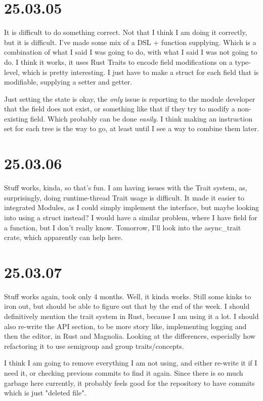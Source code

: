 \section{25.03.05}

It is difficult to do something correct. Not that I think I am doing it
correctly, but it is difficult. I've made some mix of a DSL + function
supplying. Which is a combination of what I said I was going to do, with what I
said I was not going to do. I think it works, it uses Rust Traits to encode
field modifications on a type-level, which is pretty interesting. I just have to
make a struct for each field that is modifiable, supplying a setter and getter.

Just setting the state is okay, the \textit{only} issue is reporting to
the module developer that the field does not exist, or something like that if
they try to modify a non-existing field. Which probably can be done
\textit{easily}. I think making an instruction set for each tree is the way to
go, at least until I see a way to combine them later.

\section{25.03.06}

Stuff works, kinda, so that's fun. I am having issues with the Trait system, as,
surprisingly, doing runtime-thread Trait usage is difficult. It made it easier
to integrated Modules, as I could simply implement the interface, but maybe
looking into using a struct instead? I would have a similar problem, where I
have field for a function, but I don't really know. Tomorrow, I'll look into
the async_trait crate, which apparently can help here.

\section{25.03.07}

Stuff works again, took only 4 months. Well, it kinda works. Still some kinks to
iron out, but should be able to figure out that by the end of the week. I should
definitively mention the trait system in Rust, because I am using it a lot. I
should also re-write the API section, to be more story like, implementing
logging and then the editor, in Rust and Magnolia. Looking at the differences,
especially how refactoring it to use semigroup and group traits/concepts.

I think I am going to remove everything I am not using, and either re-write it
if I need it, or checking previous commits to find it again. Since there is so
much garbage here currently, it probably feels good for the repository to have
commits which is just "deleted file".

